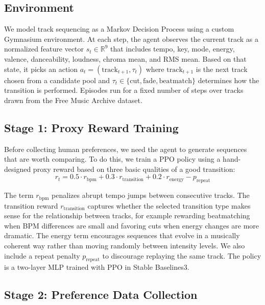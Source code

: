 \documentclass{article}
\begin{document}
\subsection{Environment}

We model track sequencing as a Markov Decision Process using a custom Gymnasium environment. At each step, the agent observes the current track as a normalized feature vector $s_t \in \mathbb{R}^9$ that includes tempo, key, mode, energy, valence, danceability, loudness, chroma mean, and RMS mean. Based on that state, it picks an action $a_t = (\text{track}_{t+1}, \tau_t)$ where $\text{track}_{t+1}$ is the next track chosen from a candidate pool and $\tau_t \in \{\text{cut}, \text{fade}, \text{beatmatch}\}$ determines how the transition is performed. Episodes run for a fixed number of steps over tracks drawn from the Free Music Archive dataset.

\subsection{Stage 1: Proxy Reward Training}

Before collecting human preferences, we need the agent to generate sequences that are worth comparing. To do this, we train a PPO policy using a hand-designed proxy reward based on three basic qualities of a good transition:
\begin{equation}
    r_t = 0.5 \cdot r_{\text{bpm}} + 0.3 \cdot r_{\text{transition}} + 0.2 \cdot r_{\text{energy}} - p_{\text{repeat}}
\end{equation}

The term $r_{\text{bpm}}$ penalizes abrupt tempo jumps between consecutive tracks. The transition reward $r_{\text{transition}}$ captures whether the selected transition type makes sense for the relationship between tracks, for example rewarding beatmatching when BPM differences are small and favoring cuts when energy changes are more dramatic. The energy term encourages sequences that evolve in a musically coherent way rather than moving randomly between intensity levels. We also include a repeat penalty $p_{\text{repeat}}$ to discourage replaying the same track. The policy is a two-layer MLP trained with PPO in Stable Baselines3.

\subsection{Stage 2: Preference Data Collection}
\end{document}
